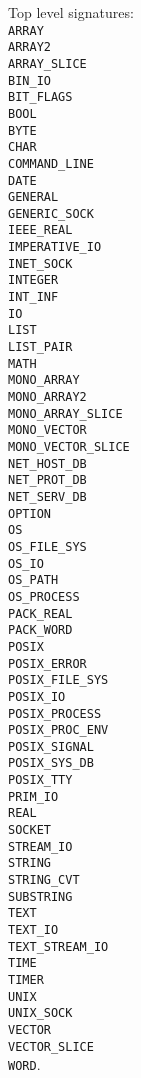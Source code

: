 \newcommand{\signature}[1]{{\tt #1}\\}
Top level signatures:\\
\signature{ARRAY}
\signature{ARRAY2}
\signature{ARRAY\_SLICE}
\signature{BIN\_IO}
\signature{BIT\_FLAGS}
\signature{BOOL}
\signature{BYTE}
\signature{CHAR}
\signature{COMMAND\_LINE}
\signature{DATE}
\signature{GENERAL}
\signature{GENERIC\_SOCK}
\signature{IEEE\_REAL}
\signature{IMPERATIVE\_IO}
\signature{INET\_SOCK}
\signature{INTEGER}
\signature{INT\_INF}
\signature{IO}
\signature{LIST}
\signature{LIST\_PAIR}
\signature{MATH}
\signature{MONO\_ARRAY}
\signature{MONO\_ARRAY2}
\signature{MONO\_ARRAY\_SLICE}
\signature{MONO\_VECTOR}
\signature{MONO\_VECTOR\_SLICE}
\signature{NET\_HOST\_DB}
\signature{NET\_PROT\_DB}
\signature{NET\_SERV\_DB}
\signature{OPTION}
\signature{OS}
\signature{OS\_FILE\_SYS}
\signature{OS\_IO}
\signature{OS\_PATH}
\signature{OS\_PROCESS}
\signature{PACK\_REAL}
\signature{PACK\_WORD}
\signature{POSIX}
\signature{POSIX\_ERROR}
\signature{POSIX\_FILE\_SYS}
\signature{POSIX\_IO}
\signature{POSIX\_PROCESS}
\signature{POSIX\_PROC\_ENV}
\signature{POSIX\_SIGNAL}
\signature{POSIX\_SYS\_DB}
\signature{POSIX\_TTY}
\signature{PRIM\_IO}
\signature{REAL}
\signature{SOCKET}
\signature{STREAM\_IO}
\signature{STRING}
\signature{STRING\_CVT}
\signature{SUBSTRING}
\signature{TEXT}
\signature{TEXT\_IO}
\signature{TEXT\_STREAM\_IO}
\signature{TIME}
\signature{TIMER}
\signature{UNIX}
\signature{UNIX\_SOCK}
\signature{VECTOR}
\signature{VECTOR\_SLICE}
{\tt WORD}.


